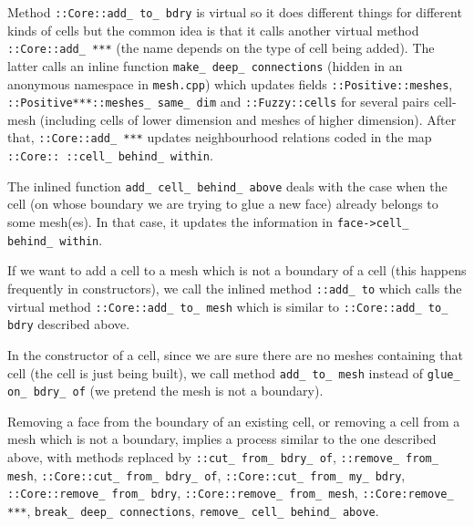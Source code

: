 Method {\small\tt {}::Core::add\_\,to\_\,bdry} is virtual so it does different things for
different kinds of cells but the common idea is that it calls another virtual method
{\small\tt {}::Core::add\_\,***} (the name depends on the type of cell being added).
The latter calls an inline function {\small\tt make\_\,deep\_\,connections} (hidden in an anonymous
namespace in {\small\tt mesh.cpp}) which updates fields
{\small\tt {}::Positive::meshes}, {\small\tt {}::Positive***::meshes\_\,same\_\,dim} and
{\small\tt {}::Fuzzy::cells} for several pairs cell-mesh
(including cells of lower dimension and meshes of higher dimension).
After that, {\small\tt {}::Core::add\_\,***} updates neighbourhood relations
coded in the map {\small\tt {}::Core:: ::cell\_\,behind\_\,within}.

The inlined function {\small\tt add\_\,cell\_\,behind\_\,above} deals with
the case when the cell (on whose boundary we are trying to glue a new face)
already belongs to some mesh(es).
In that case, it updates the information in {\small\tt face->cell\_\,behind\_\,within}.

If we want to add a cell to a mesh which is not a boundary of a cell (this happens
frequently in {\small\tt {}} constructors),
we call the inlined method {\small\tt {}::add\_\,to} which calls the virtual method
{\small\tt {}::Core::add\_\,to\_\,mesh} which is similar to {\small\tt {}::Core::add\_\,to\_\,bdry}
described above.

In the constructor of a cell, since we are sure there are no meshes containing that cell
(the cell is just being built),
we call method {\small\tt add\_\,to\_\,mesh} instead of {\small\tt glue\_\,on\_\,bdry\_\,of}
(we pretend the mesh is not a boundary).

Removing a face from the boundary of an existing cell, or removing a cell from a mesh
which is not a boundary, implies a process similar to the one described above,
with methods replaced by {\small\tt {}::cut\_\,from\_\,bdry\_\,of},
{\small\tt {}::remove\_\,from\_\,mesh},
{\small\tt {}::Core::cut\_\,from\_\,bdry\_\,of},
{\small\tt {}::Core::cut\_\,from\_\,my\_\,bdry},
{\small\tt {}::Core::remove\_\,from\_\,bdry}, {\small\tt {}::Core::remove\_\,from\_\,mesh},
{\small\tt {}::Core:remove\_\,***}, {\small\tt break\_\,deep\_\,connections},
{\small\tt remove\_\,cell\_\,behind\_\,above}.

